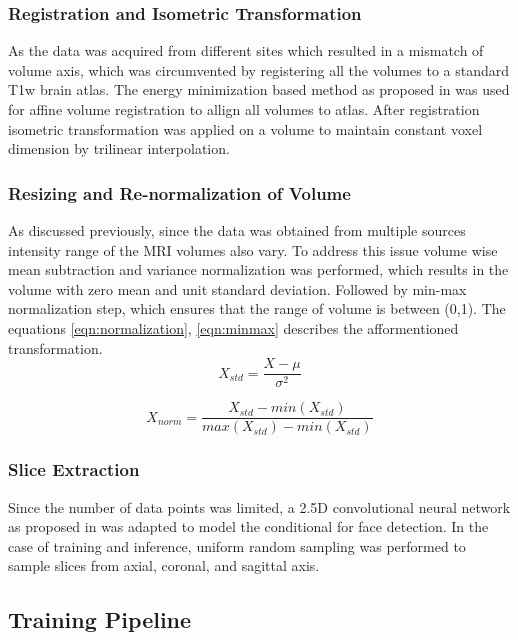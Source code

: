 \documentclass[runningheads]{llncs}
\begin{document}
\subsubsection{Registration and Isometric Transformation}
As the data was acquired from different sites which resulted in a mismatch of volume axis, which was circumvented by registering all the volumes to a standard T1w brain atlas. The energy minimization based method as proposed in \cite{} was used for affine volume registration to allign all volumes to atlas. After registration isometric transformation was applied on a volume to maintain constant voxel dimension by trilinear interpolation.

\subsubsection{Resizing and Re-normalization of Volume}
As discussed previously, since the data was obtained from multiple sources intensity range of the MRI volumes also vary. To address this issue volume wise mean subtraction and variance normalization was performed, which results in the volume with zero mean and unit standard deviation. Followed by min-max normalization step, which ensures that the range of volume is between (0,1). The equations \ref{eqn:normalization}, \ref{eqn:minmax} describes the afformentioned transformation.
\begin{equation}
 \label{eqn:normalization}
 X_{std} = \frac{X - \mu}{\sigma^2}
\end{equation}

\begin{equation}
 \label{eqn:minmax}
 X_{norm} = \frac{X_{std} - min(X_{std})}{max(X_{std}) - min(X_{std})}
\end{equation}

\subsubsection{Slice Extraction}
Since the number of data points was limited, a 2.5D convolutional neural network as proposed in \cite{} was adapted to model the conditional for face detection. In the case of training and inference, uniform random sampling was performed to sample slices from axial, coronal, and sagittal axis.

\subsection{Training Pipeline}
\end{document}
